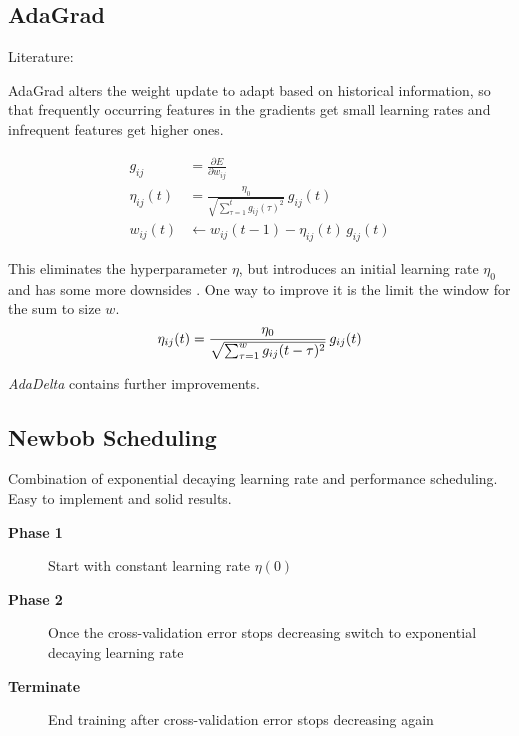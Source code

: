 \subsection{AdaGrad}
Literature: \cite{Zeiler2012,Duchi2011,Dyer}

AdaGrad alters the weight update to adapt based on historical information, so that frequently occurring features in the gradients get small learning rates and infrequent features get higher ones.

\begin{align}
g_{ij} &= \frac{\partial E}{\partial w_{ij}}\\
\eta_{ij}(t) &= \frac{\eta_0}{\sqrt{\sum_{\tau=1}^t g_{ij}(\tau)^2}}\,g_{ij}(t)\\
w_{ij}(t) &\leftarrow w_{ij}(t-1) - \eta_{ij}(t)\,g_{ij}(t)
\end{align}

This eliminates the hyperparameter $\eta$, but introduces an initial learning rate $\eta_0$ and has some more downsides \cite{Zeiler2012}. One way to improve it is the limit the window for the sum to size $w$.
\begin{equation}
\eta_{ij}(t) = \frac{\eta_0}{\sqrt{\sum_{\tau=1}^w g_{ij}(t-\tau)^2}}\,g_{ij}(t)\\
\end{equation}

\emph{AdaDelta} contains further improvements.

\subsection{Newbob Scheduling}
Combination of exponential decaying learning rate and performance scheduling. Easy to implement and solid results.
\begin{description}
\item[\textbf{Phase 1}] Start with constant learning rate $\eta(0)$
\item[\textbf{Phase 2}] Once the cross-validation error stops decreasing switch to exponential decaying learning rate
\item[\textbf{Terminate}] End training after cross-validation error stops decreasing again
\end{description}
